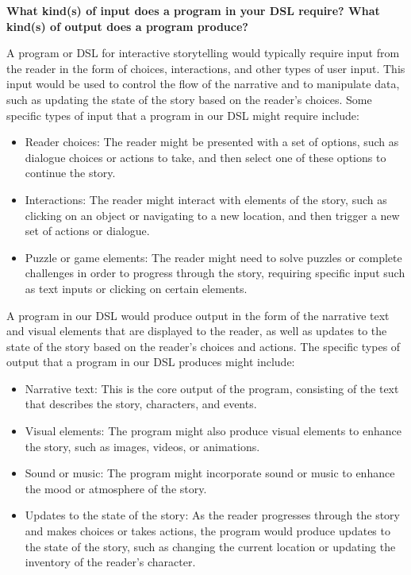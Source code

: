 \textbf {What kind(s) of input does a program in your DSL require? What kind(s) of output does a program produce?}

A program or DSL for interactive storytelling would typically require input from the reader in the form of choices, interactions, and other types of user input. This input would be used to control the flow of the narrative and to manipulate data, such as updating the state of the story based on the reader's choices.
Some specific types of input that a program in our DSL might require include:

\begin{itemize}
                \item Reader choices: The reader might be presented with a set of options, such as dialogue choices or actions to take, and then select one of these options to continue the story.
                \item Interactions: The reader might interact with elements of the story, such as clicking on an object or navigating to a new location, and then trigger a new set of actions or dialogue.
                \item Puzzle or game elements: The reader might need to solve puzzles or complete challenges in order to progress through the story, requiring specific input such as text inputs or clicking on certain elements.
 \end{itemize}
A program in our DSL would produce output in the form of the narrative text and visual elements that are displayed to the reader, as well as updates to the state of the story based on the reader's choices and actions. The specific types of output that a program in our DSL produces might include:

\begin{itemize}
                \item Narrative text: This is the core output of the program, consisting of the text that describes the story, characters, and events.
                \item Visual elements: The program might also produce visual elements to enhance the story, such as images, videos, or animations.
                \item Sound or music: The program might incorporate sound or music to enhance the mood or atmosphere of the story.
                \item Updates to the state of the story: As the reader progresses through the story and makes choices or takes actions, the program would produce updates to the state of the story, such as changing the current location or updating the inventory of the reader's character.
 \end{itemize}

